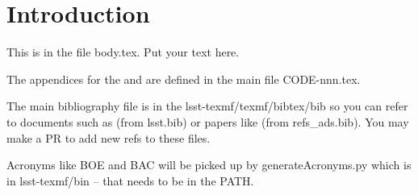 \section{Introduction} \label{sec:intro}
This is in the file body.tex. Put your text here.

The appendices for the  and  are defined in the main file CODE-nnn.tex.

The main bibliography file is in the lsst-texmf/texmf/bibtex/bib so you can refer to documents such as  (from lsst.bib)  or papers like \cite{2008arXiv0805.2366I} (from refs\_ads.bib). You may make a PR to add new refs to these files.

Acronyms like BOE and BAC will be picked up by generateAcronyms.py which is in lsst-texmf/bin -- that needs to be in the PATH.
